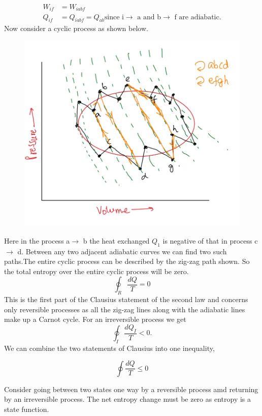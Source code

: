 \documentclass[12pt]{article}
\begin{document}
\begin{align*}
	W_{if}&=W_{iabf}\\
	Q_{if}&=Q_{iabf}=Q_{ab} \text{since i$\to$ a and b$\to$ f are adiabatic.}
\end{align*}
Now consider a cyclic process as shown below. 
\begin{figure}[h]
	\includegraphics[scale=0.6]{clausius2.jpg}
	\centering
\end{figure}
Here in the process a$\to$ b the heat exchanged $Q_1$ is negative of that in process c $\to$ d. Between any two adjacent adiabatic curves we can find two such paths.The entire cyclic process can be described by the zig-zag path shown. So the total entropy over the entire cyclic process will be zero.
\begin{equation}
	\oint_R \dfrac{dQ}{T}=0
\end{equation}
This is the first part of the Clausius statement of the second law and concerns only reversible processes as all the zig-zag lines along with the adiabatic lines make up a Carnot cycle. For an irreversible process we get $$\oint_I \dfrac{dQ_I}{T}<0.$$
We can combine the two statements of Clausius into one inequality,
\begin{tcolorbox}[title=Clausius's Inequality]
	\begin{equation}
	\oint \dfrac{dQ}{T}\leq 0
	\end{equation} 
\end{tcolorbox}
Consider going between two states one way by a reversible process amd returning by an irreversible process. The net entropy change must be zero as entropy is a state function. 
\end{document}
